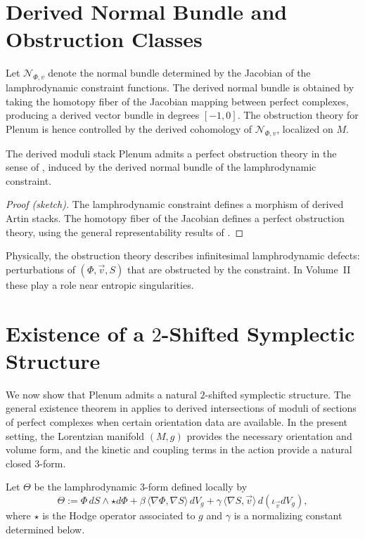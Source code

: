 \section{Derived Normal Bundle and Obstruction Classes}

Let $\mathcal{N}_{\Phi,v}$ denote the normal bundle determined by the
Jacobian of the lamphrodynamic constraint functions.
The derived normal bundle is obtained by taking the homotopy fiber
of the Jacobian mapping between perfect complexes, producing a derived
vector bundle in degrees $[-1,0]$.
The obstruction theory for $\mathrm{Plenum}$ is hence controlled by the
derived cohomology of $\mathcal{N}_{\Phi,v}$, localized on $M$.

\begin{theorem}
\label{thm:obstruction-Plenum}
The derived moduli stack $\mathrm{Plenum}$ admits a perfect obstruction
theory in the sense of \cite{BF97}, induced by the derived normal bundle
of the lamphrodynamic constraint.
\end{theorem}

\begin{proof}[Proof (sketch)]
The lamphrodynamic constraint defines a morphism of derived Artin stacks.
The homotopy fiber of the Jacobian defines a perfect obstruction theory,
using the general representability results of
\cite{BF97,ToenVezzosi-HAGII}.
\end{proof}

\begin{remark}
Physically, the obstruction theory describes infinitesimal lamphrodynamic
defects: perturbations of $(\Phi,\vec v,S)$ that are obstructed by the
constraint. In Volume~II these play a role near entropic singularities.
\end{remark}


\section{Existence of a $2$-Shifted Symplectic Structure}

We now show that $\mathrm{Plenum}$ admits a natural $2$-shifted
symplectic structure. The general existence theorem in \cite{PTVV13}
applies to derived intersections of moduli of sections of perfect
complexes when certain orientation data are available. In the present
setting, the Lorentzian manifold $(M,g)$ provides the necessary
orientation and volume form, and the kinetic and coupling terms in the
action provide a natural closed $3$-form.

Let $\Theta$ be the lamphrodynamic $3$-form defined locally by
\begin{equation}
\label{eq:local3form}
\Theta :=
\Phi\, dS\wedge \star d\Phi
+ \beta\, \langle\nabla\Phi,\nabla S\rangle\, dV_g
+ \gamma\, \langle\nabla S,\vec v\rangle\, d(\iota_{\vec v}dV_g),
\end{equation}
where $\star$ is the Hodge operator associated to $g$ and
$\gamma$ is a normalizing constant determined below.


